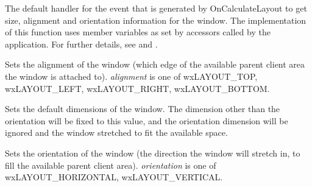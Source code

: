 \label{wxsashlayoutwindowonquerylayoutinfo}


The default handler for the event that is generated by OnCalculateLayout to get
size, alignment and orientation information for the window. The implementation
of this function uses member variables as set by accessors called by the application.
For further details, see  and .

\label{wxsashlayoutwindowsetalignment}


Sets the alignment of the window (which edge of the available parent client area the window
is attached to). {\it alignment} is one of wxLAYOUT\_TOP, wxLAYOUT\_LEFT, wxLAYOUT\_RIGHT, wxLAYOUT\_BOTTOM.

\label{wxsashlayoutwindowsetdefaultsize}


Sets the default dimensions of the window. The dimension other than the orientation will be fixed to this
value, and the orientation dimension will be ignored and the window stretched to fit the available space.

\label{wxsashlayoutwindowsetorientation}


Sets the orientation of the window (the direction the window will stretch in, to fill the available
parent client area). {\it orientation} is one of wxLAYOUT\_HORIZONTAL, wxLAYOUT\_VERTICAL.



